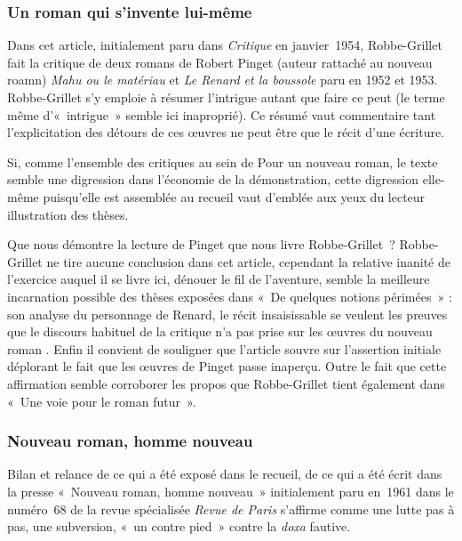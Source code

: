 \documentclass[12pt, a4paper]{article}
\begin{document}
\subsubsection{Un roman qui s'invente lui-même}
Dans cet article, initialement paru dans \textit{Critique} en janvier~1954, Robbe-Grillet fait la critique de deux romans de Robert Pinget (auteur rattaché au nouveau roamn) \textit{Mahu ou le matériau} et \textit{Le Renard et la boussole} paru en 1952 et 1953. Robbe-Grillet s'y emploie à résumer l'intrigue autant que faire ce peut (le terme même d'«~intrigue~» semble ici inaproprié). Ce résumé vaut commentaire tant l'explicitation des détours de ces œuvres ne peut être que le récit d'une écriture.

Si, comme l'ensemble des critiques au sein de Pour un nouveau roman, le texte semble une digression dans l'économie de la démonstration, cette digression elle-même puisqu'elle est assemblée au recueil vaut d'emblée aux yeux du lecteur illustration des thèses.

Que nous démontre la lecture de Pinget que nous livre Robbe-Grillet~? Robbe-Grillet ne tire aucune conclusion dans cet article, cependant la relative inanité de l'exercice auquel il se livre ici, dénouer le fil de l'aventure, semble la meilleure incarnation possible des thèses exposées dans «~De quelques notions périmées~» : son analyse du personnage de Renard, le récit insaisissable se veulent les preuves que le discours habituel de la critique n'a pas prise sur les œuvres du nouveau roman%
. Enfin il convient de souligner que l'article souvre sur l'assertion initiale déplorant le fait que les œuvres de Pinget passe inaperçu. Outre le fait que cette affirmation semble corroborer les propos que Robbe-Grillet tient également dans «~Une voie pour le roman futur~».%
	
	



\subsubsection{Nouveau roman, homme nouveau}
			Bilan et relance de ce qui a été exposé dans le recueil, de ce qui a été écrit dans la presse «~Nouveau roman, homme nouveau~» initialement paru en~1961 dans le numéro~68 de la revue spécialisée \textit{Revue de Paris} s'affirme comme une lutte pas à pas, une subversion, «~un contre pied~» contre la \textit{doxa} fautive.
\end{document}
